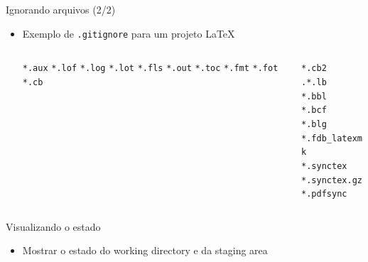 \documentclass[14pt]{beamer}
\begin{document}
\begin{frame}[fragile]{Ignorando arquivos (2/2)}
    \begin{itemize}
        \item Exemplo de \texttt{.gitignore} para um projeto \LaTeX\\
        \begin{columns}
            \begin{column}{0.2\textwidth}
                \texttt{*.aux}
                \texttt{*.lof}
                \texttt{*.log}
                \texttt{*.lot}
                \texttt{*.fls}
                \texttt{*.out}
                \texttt{*.toc}
                \texttt{*.fmt}
                \texttt{*.fot}
                \texttt{*.cb}
            \end{column}
            \begin{column}{0.5\textwidth}                
                \texttt{*.cb2}\\
                \texttt{.*.lb}\\
                \texttt{*.bbl}\\
                \texttt{*.bcf}\\
                \texttt{*.blg}\\
                \texttt{*.fdb\_latexmk}\\
                \texttt{*.synctex}\\
                \texttt{*.synctex.gz}\\
                \texttt{*.pdfsync}
            \end{column}
        \end{columns}
    \end{itemize}    
\end{frame}

\begin{frame}[fragile]{Visualizando o estado}
    \begin{itemize}
        \item Mostrar o estado do working directory e da staging area
    \end{itemize}
\end{frame}
\end{document}
